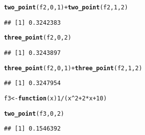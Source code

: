\documentclass[11pt, a4paper]{article}\usepackage[]{graphicx}\usepackage[]{xcolor}
\makeatletter
\newcommand{\hlnum}[1]{\textcolor[rgb]{0.686,0.059,0.569}{#1}}%
\newcommand{\hlopt}[1]{\textcolor[rgb]{0,0,0}{#1}}%
\newcommand{\hldef}[1]{\textcolor[rgb]{0.345,0.345,0.345}{#1}}%
\newcommand{\hlkwa}[1]{\textcolor[rgb]{0.161,0.373,0.58}{\textbf{#1}}}%
\newcommand{\hlkwb}[1]{\textcolor[rgb]{0.69,0.353,0.396}{#1}}%
\newcommand{\hlkwc}[1]{\textcolor[rgb]{0.333,0.667,0.333}{#1}}%
\newcommand{\hlkwd}[1]{\textcolor[rgb]{0.737,0.353,0.396}{\textbf{#1}}}%
\newenvironment{kframe}{%
 \def\at@end@of@kframe{}%
 \ifinner\ifhmode%
  \def\at@end@of@kframe{\end{minipage}}%
  \begin{minipage}{\columnwidth}%
 \fi\fi%
 \def\FrameCommand##1{\hskip\@totalleftmargin \hskip-\fboxsep
 \colorbox{shadecolor}{##1}\hskip-\fboxsep
     \hskip-\linewidth \hskip-\@totalleftmargin \hskip\columnwidth}%
 \MakeFramed {\advance\hsize-\width
   \@totalleftmargin\z@ \linewidth\hsize
   \@setminipage}}%
 {\par\unskip\endMakeFramed%
 \at@end@of@kframe}
\newenvironment{knitrout}{}{} %
\makeatother
\begin{document}
\begin{knitrout}
\color{fgcolor}\begin{kframe}
\begin{alltt}
\hlkwd{two_point}\hldef{(f2,} \hlnum{0}\hldef{,} \hlnum{1}\hldef{)} \hlopt{+} \hlkwd{two_point}\hldef{(f2,} \hlnum{1}\hldef{,} \hlnum{2}\hldef{)}
\end{alltt}
\begin{verbatim}
## [1] 0.3242383
\end{verbatim}
\end{kframe}
\end{knitrout}

\begin{knitrout}
\color{fgcolor}\begin{kframe}
\begin{alltt}
\hlkwd{three_point}\hldef{(f2,} \hlnum{0}\hldef{,} \hlnum{2}\hldef{)}
\end{alltt}
\begin{verbatim}
## [1] 0.3243897
\end{verbatim}
\end{kframe}
\end{knitrout}

\begin{knitrout}
\color{fgcolor}\begin{kframe}
\begin{alltt}
\hlkwd{three_point}\hldef{(f2,} \hlnum{0}\hldef{,} \hlnum{1}\hldef{)} \hlopt{+} \hlkwd{three_point}\hldef{(f2,} \hlnum{1}\hldef{,} \hlnum{2}\hldef{)}
\end{alltt}
\begin{verbatim}
## [1] 0.3247954
\end{verbatim}
\end{kframe}
\end{knitrout}

\begin{knitrout}
\color{fgcolor}\begin{kframe}
\begin{alltt}
\hldef{f3} \hlkwb{<-} \hlkwa{function}\hldef{(}\hlkwc{x}\hldef{)} \hlnum{1} \hlopt{/} \hldef{(x}\hlopt{^}\hlnum{2} \hlopt{+} \hlnum{2}\hlopt{*}\hldef{x} \hlopt{+} \hlnum{10}\hldef{)}

\hlkwd{two_point}\hldef{(f3,} \hlnum{0}\hldef{,} \hlnum{2}\hldef{)}
\end{alltt}
\begin{verbatim}
## [1] 0.1546392
\end{verbatim}
\end{kframe}
\end{knitrout}
\end{document}
